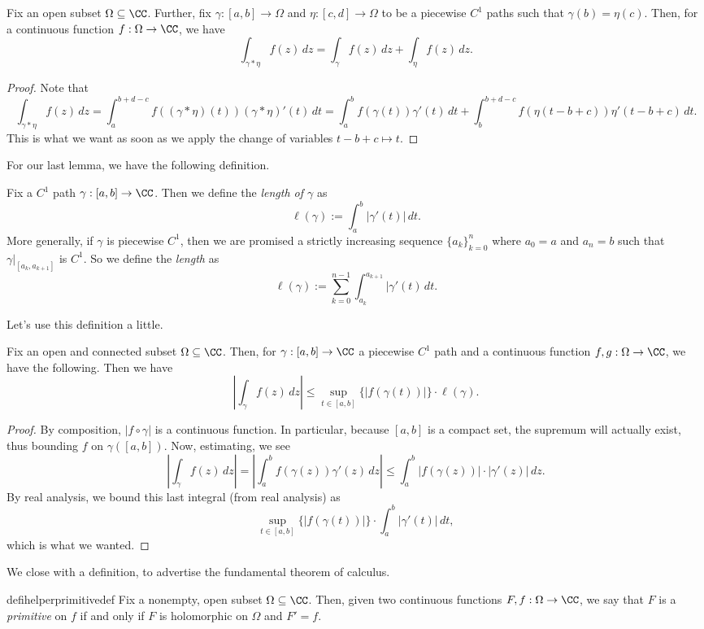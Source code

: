 \begin{lemma} \label{lem:concatintegral}
	Fix an open subset $\Omega\subseteq\CC$. Further, fix $\gamma:[a,b]\to\Omega$ and $\eta:[c,d]\to\Omega$ to be a piecewise $C^1$ paths such that $\gamma(b)=\eta(c)$. Then, for a continuous function $f:\Omega\to\CC$, we have
	\[\int_{\gamma*\eta}f(z)\,dz=\int_\gamma f(z)\,dz+\int_\eta f(z)\,dz.\]
\end{lemma}
\begin{proof}
	Note that
	\[\int_{\gamma*\eta}f(z)\,dz=\int_a^{b+d-c}f((\gamma*\eta)(t))(\gamma*\eta)'(t)\,dt=\int_a^bf(\gamma(t))\gamma'(t)\,dt+\int_{b}^{b+d-c}f(\eta(t-b+c))\eta'(t-b+c)\,dt.\]
	This is what we want as soon as we apply the change of variables $t-b+c\mapsto t$.
\end{proof}
For our last lemma, we have the following definition.
\begin{definition}[Length]
	Fix a $C^1$ path $\gamma:[a,b]\to\CC$. Then we define the \textit{length of $\gamma$} as
	\[\ell(\gamma):=\int_a^b|\gamma'(t)|\,dt.\]
	More generally, if $\gamma$ is piecewise $C^1$, then we are promised a strictly increasing sequence $\{a_k\}_{k=0}^n$ where $a_0=a$ and $a_n=b$ such that $\gamma|_{[a_k,a_{k+1}]}$ is $C^1$. So we define the \textit{length} as
	\[\ell(\gamma):=\sum_{k=0}^{n-1}\int_{a_k}^{a_{k+1}}|\gamma'(t)\,dt.\]
\end{definition}
Let's use this definition a little.
\begin{proposition} \label{lem:estimation}
	Fix an open and connected subset $\Omega\subseteq\CC$. Then, for $\gamma:[a,b]\to\CC$ a piecewise $C^1$ path and a continuous function $f,g:\Omega\to\CC$, we have the following. Then we have
	\[\left|\int_\gamma f(z)\,dz\right|\le\sup_{t\in[a,b]}\{|f(\gamma(t))|\}\cdot\ell(\gamma).\]
\end{proposition}
\begin{proof}
	By composition, $|f\circ\gamma|$ is a continuous function. In particular, because $[a,b]$ is a compact set, the supremum will actually exist, thus bounding $f$ on $\gamma([a,b])$.  Now, estimating, we see
	\[\left|\int_\gamma f(z)\,dz\right|=\left|\int_a^bf(\gamma(z))\gamma'(z)\,dz\right|\le\int_a^b|f(\gamma(z))|\cdot|\gamma'(z)|\,dz.\]
	By real analysis, we bound this last integral (from real analysis) as
	\[\sup_{t\in[a,b]}\{|f(\gamma(t))|\}\cdot\int_a^b|\gamma'(t)|\,dt,\]
	which is what we wanted.
\end{proof}
We close with a definition, to advertise the fundamental theorem of calculus.
\begin{restatable}[Primitive]{defihelper}{primitivedef} 
	Fix a nonempty, open subset $\Omega\subseteq\CC$. Then, given two continuous functions $F,f:\Omega\to\CC$, we say that $F$ is a \textit{primitive} on $f$ if and only if $F$ is holomorphic on $\Omega$ and $F'=f$.
\end{restatable}
